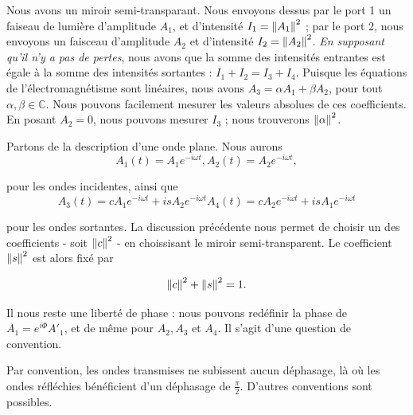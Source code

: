 \documentclass[../notesdecours.tex]{subfiles}
\begin{document}
Nous avons un miroir semi-transparant. Nous envoyons dessus par le port 1 un faiseau de lumière d'amplitude $A_1$, et d'intensité $I_1 = \norm{A_1}^2$ ; par le port 2, nous envoyons un faisceau d'amplitude $A_2$ et d'intensité $I_2 = \norm{A_2}^2$. \emph{En supposant qu'il n'y a pas de pertes}, nous avons que la somme des intensités entrantes est égale à la somme des intensités sortantes : $I_1 + I_2 = I_3 + I_4$. Puisque les équations de l'électromagnétisme sont linéaires, nous avons $A_3 = \alpha A_1 + \beta A_2$, pour tout $\alpha,\beta\in\mathbb{C}$. Nous pouvons facilement mesurer les valeurs absolues de ces coefficients. En posant $A_2 = 0$, nous pouvons mesurer $I_3$ ; nous trouverons $\norm{\alpha}^2$.

Partons de la description d'une onde plane. Nous aurons
\begin{subequations}
    \begin{equation}
        A_1 (t) = A_1e^{-i\omega t},
    \end{equation}
    \begin{equation}
        A_2 (t) = A_2e^{-i\omega t},
    \end{equation}
\end{subequations}

pour les ondes incidentes, ainsi que
\begin{subequations}
    \begin{equation}
        A_3 (t) = cA_1e^{-i\omega t} + i s A_2e^{-i\omega t}
    \end{equation}
    \begin{equation}
        A_4 (t) = c A_2e^{-i\omega t} + i sA_1e^{-i\omega t}
    \end{equation}
\end{subequations}

pour les ondes sortantes. La discussion précédente nous permet de choisir un des coefficients - soit $\norm{c}^2$ - en choissisant le miroir semi-transparent. Le coefficient $\norm{s}^2$ est alors fixé par

\begin{equation}
\norm{c}^2 + \norm{s}^2 = 1.
\end{equation}

Il nous reste une liberté de phase : nous pouvons redéfinir la phase de $A_1 = e^{i \Phi}A'_1$, et de même pour $A_2, A_3$ et $A_4$. Il s'agit d'une question de convention.

\begin{remark} 
    Par convention, les ondes transmises ne subissent aucun déphasage, là où les ondes réfléchies bénéficient d'un déphasage de $\frac{\pi}{2}$. D'autres conventions sont possibles.
\end{remark}
\end{document}
